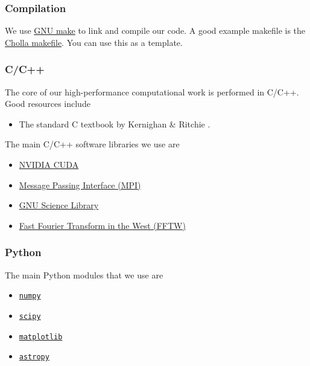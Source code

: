 \subsubsection{Compilation}
\label{sec:compilation}

We use \href{https://www.gnu.org/software/make/}{GNU make} to link and compile our code.  A good example makefile is the \href{https://raw.githubusercontent.com/cholla-hydro/cholla/master/Makefile}{Cholla makefile}.  You can use this as a template.

\subsubsection{C/C++}
\label{sec:c}

The core of our high-performance computational work is performed in C/C++. Good resources include

\begin{itemize}
	\item The standard C textbook by Kernighan \& Ritchie \cite{kernighan1988a}.
\end{itemize} 

\noindent
The main C/C++ software libraries we use are
\begin{itemize}
	\item \href{https://developer.nvidia.com/cuda-zone}{NVIDIA CUDA}
	\item \href{https://www.open-mpi.org}{Message Passing Interface (MPI)}
	\item \href{https://www.gnu.org/software/gsl/}{GNU Science Library}
	\item \href{http://www.fftw.org/}{Fast Fourier Transform in the West (FFTW)}
\end{itemize}

\subsubsection{Python}
\label{sec:python}

The main Python modules that we use are
\begin{itemize}
	\item \href{https://numpy.org}{\tt numpy}
	\item \href{https://www.scipy.org}{\tt scipy}
	\item \href{https://matplotlib.org}{\tt matplotlib}
	\item \href{https://www.astropy.org}{\tt astropy}
\end{itemize}

